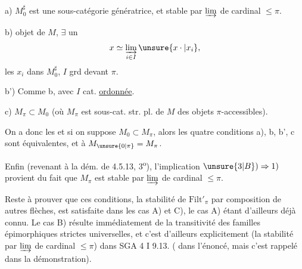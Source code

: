 a) $M_0^\sharp$ est une sous-catégorie  génératrice,  et stable  par $\varinjlim$ de cardinal $\leq\pi$.

b)   objet de $M$,  $\exists$ un
\[
x\simeq\varinjlim_{i\in I}\unsure{x\cdot|x_i},
\]
les $x_i$ dans $M_0^\sharp$,  $I$ grd devant $\pi$.

b') Comme b, avec $I$ cat. \uline{ordonnée}.

c) $M_\pi\subset M_0$ (où $M_\pi$ est  sous-cat. str. pl. de $M$  des objets $\pi$-accessibles).

On a donc les 
et si on suppose $M_0\subset M_\pi$,  alors les quatre conditions a), b, b', c sont équivalentes, et  à $M_{\unsure{0|\pi}}=M_\pi$.

 Enfin (revenant à la dém. de 4.5.13, 3\textsuperscript{o}), l'implication $\unsure{3|B})\Rightarrow1)$ provient du fait que $M_\pi$ est stable par $\varinjlim$ de cardinal $\leq\pi$.

Reste à prouver que ces conditions,  la stabilité de $\mathrm{Filt}'_\pi$ par composition de autres flèches, est satisfaite dans les cas A) et C), le cas A) étant d'ailleurs déjà connu. Le cas B) résulte  immédiatement de la transitivité des familles épimorphiques strictes universelles,  et c'est d'ailleurs  explicitement  (la stabilité  par $\varinjlim$ de cardinal $\leq\pi$) dans SGA 4 I 9.13. ( dans l'énoncé, mais c'est rappelé dans la démonstration).

